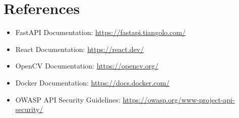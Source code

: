 \documentclass[12pt]{article}
\begin{document}
\section{References}

\begin{itemize}
    \item FastAPI Documentation: \url{https://fastapi.tiangolo.com/}
    \item React Documentation: \url{https://react.dev/}
    \item OpenCV Documentation: \url{https://opencv.org/}
    \item Docker Documentation: \url{https://docs.docker.com/}
    \item OWASP API Security Guidelines: \url{https://owasp.org/www-project-api-security/}
\end{itemize}
\end{document}
